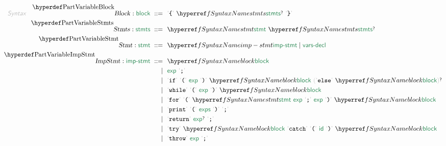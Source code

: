 \begin{align*}
  \KEY{Syntax} \quad
    \VARDECL{Block} : \SYN{block}
      \ ::= \ & \
      \LEX{{\LEFTBRACE}} \ \SYNREF{stmts}\QUERY \ \LEX{{\RIGHTBRACE}}
    \\
    \VARDECL{Stmts} : \SYN{stmts}
      \ ::= \ & \
      \SYNREF{stmt} \ \SYNREF{stmts}\QUERY
    \\
    \VARDECL{Stmt} : \SYN{stmt}
      \ ::= \ & \
      \SYNREF{imp-stmt} \mid \SYNHYPER{../.}{SIMPLE-4-Declarations}{vars-decl}
    \\
    \VARDECL{ImpStmt} : \SYN{imp-stmt}
      \ ::= \ & \
      \SYNREF{block} \\
      \ \mid \ & \ \SYNHYPER{../.}{SIMPLE-2-Expressions}{exp} \ \LEX{{;}} \\
      \ \mid \ & \ \LEX{if} \ \LEX{{(}} \ \SYNHYPER{../.}{SIMPLE-2-Expressions}{exp} \ \LEX{{)}} \ \SYNREF{block} \ \LEFTGROUP \LEX{else} \ \SYNREF{block} \RIGHTGROUP\QUERY \\
      \ \mid \ & \ \LEX{while} \ \LEX{{(}} \ \SYNHYPER{../.}{SIMPLE-2-Expressions}{exp} \ \LEX{{)}} \ \SYNREF{block} \\
      \ \mid \ & \ \LEX{for} \ \LEX{{(}} \ \SYNREF{stmt} \ \SYNHYPER{../.}{SIMPLE-2-Expressions}{exp} \ \LEX{{;}} \ \SYNHYPER{../.}{SIMPLE-2-Expressions}{exp} \ \LEX{{)}} \ \SYNREF{block} \\
      \ \mid \ & \ \LEX{print} \ \LEX{{(}} \ \SYNHYPER{../.}{SIMPLE-2-Expressions}{exps} \ \LEX{{)}} \ \LEX{{;}} \\
      \ \mid \ & \ \LEX{return} \ \SYNHYPER{../.}{SIMPLE-2-Expressions}{exp}\QUERY \ \LEX{{;}} \\
      \ \mid \ & \ \LEX{try} \ \SYNREF{block} \ \LEX{catch} \ \LEX{{(}} \ \SYNHYPER{../.}{SIMPLE-1-Lexical}{id} \ \LEX{{)}} \ \SYNREF{block} \\
      \ \mid \ & \ \LEX{throw} \ \SYNHYPER{../.}{SIMPLE-2-Expressions}{exp} \ \LEX{{;}}
\end{align*}
